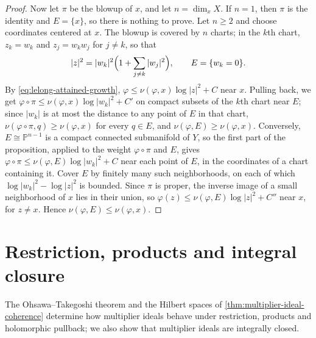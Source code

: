 \begin{proof}
Now let $\pi$ be the blowup of $x$, and let $n=\dim_xX$. If $n=1$, then $\pi$ is the identity and $E=\{x\}$, so there is nothing to prove. Let $n\geq2$ and choose coordinates centered at $x$. The blowup is covered by $n$ charts; in the $k$th chart, $z_k=w_k$ and $z_j=w_kw_j$ for $j\neq k$, so that
\[
 |z|^2=|w_k|^2\Bigl(1+\sum_{j\neq k}|w_j|^2\Bigr),\qquad E=\{w_k=0\}.
\]
By \eqref{eq:lelong-attained-growth}, $\varphi\leq\nu(\varphi,x)\log|z|^2+C$ near $x$. Pulling back, we get $\varphi\circ\pi\leq\nu(\varphi,x)\log|w_k|^2+C'$ on compact subsets of the $k$th chart near $E$; since $|w_k|$ is at most the distance to any point of $E$ in that chart, $\nu(\varphi\circ\pi,q)\geq\nu(\varphi,x)$ for every $q\in E$, and $\nu(\varphi,E)\geq\nu(\varphi,x)$. Conversely, $E\cong\mathbb P^{n-1}$ is a compact connected submanifold of $Y$, so the first part of the proposition, applied to the weight $\varphi\circ\pi$ and $E$, gives $\varphi\circ\pi\leq\nu(\varphi,E)\log|w_k|^2+C$ near each point of $E$, in the coordinates of a chart containing it. Cover $E$ by finitely many such neighborhoods, on each of which $\log|w_k|^2-\log|z|^2$ is bounded. Since $\pi$ is proper, the inverse image of a small neighborhood of $x$ lies in their union, so $\varphi(z)\leq\nu(\varphi,E)\log|z|^2+C''$ near $x$, for $z\neq x$. Hence $\nu(\varphi,E)\leq\nu(\varphi,x)$.
\end{proof}

\section{Restriction, products and integral closure}
\label{sec:multiplier-ideal-operations}

The Ohsawa--Takegoshi theorem and the Hilbert spaces of \cref{thm:multiplier-ideal-coherence} determine how multiplier ideals behave under restriction, products and holomorphic pullback; we also show that multiplier ideals are integrally closed.

